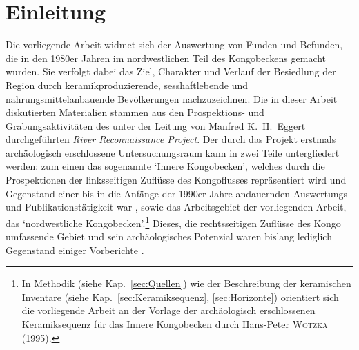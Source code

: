 \chapter{Einleitung}
\begin{multicols}{2}
\raggedcolumns
\noindent Die vorliegende Arbeit widmet sich der Auswertung von Funden und Befunden, die in den 1980er Jahren im nordwestlichen Teil des Kongobeckens gemacht wurden. Sie verfolgt dabei das Ziel, Charakter und Verlauf der Besiedlung der Region durch keramikproduzierende, sesshaftlebende und nahrungsmittelanbauende Bevölkerungen nachzuzeichnen. Die in dieser Arbeit diskutierten Materialien stammen aus den Prospektions- und Grabungsaktivitäten des unter der Leitung von Manfred K.~H.~Eggert durchgeführten \textit{River Reconnaissance Project}. Der durch das Projekt erstmals archäologisch erschlossene Untersuchungsraum \parencite[siehe][295 Abb.~16.2]{Eggert.1993} kann in zwei Teile untergliedert werden: zum einen das sogenannte \enquote*{Innere Kongobecken}, welches durch die Prospektionen der linksseitigen Zuflüsse des Kongoflusses repräsentiert wird und Gegenstand einer bis in die Anfänge der 1990er Jahre andauernden Auswertungs- und Publikationstätigkeit war \parencites{Eggert.1980b}{Eggert.1981}{Eggert.1983}{Eggert.1984}{Eggert.1984b}{Eggert.1987}{Wotzka.1995}, sowie das Arbeitsgebiet der vorliegenden Arbeit, das \enquote*{nordwestliche Kongobecken}.\footnote{In Methodik (siehe Kap.~\ref{sec:Quellen}) wie der Beschreibung der keramischen Inventare (siehe Kap.~\ref{sec:Keramiksequenz}, \ref{sec:Horizonte}) orientiert sich die vorliegende Arbeit an der Vorlage der archäologisch erschlossenen Keramiksequenz für das Innere Kongobecken durch Hans-Peter \textsc{Wotzka} (1995).} Dieses, die rechtsseitigen Zuflüsse des Kongo umfassende Gebiet und sein archäologisches Potenzial waren bislang lediglich Gegenstand einiger Vorberichte \parencites{Eggert.1987c}{Eggert.1992}{Eggert.1993}. 


\end{multicols}
